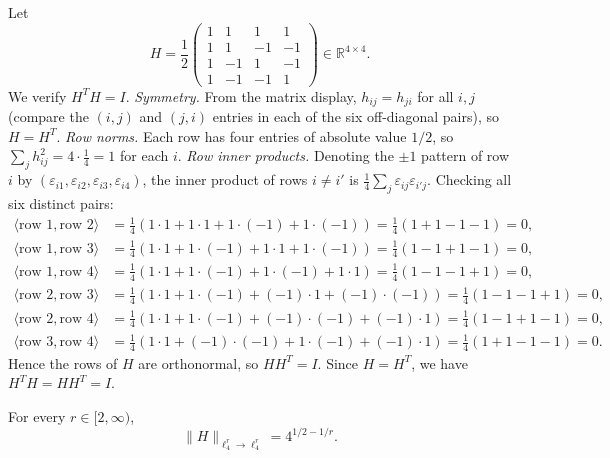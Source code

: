 Let
\[
H=\frac{1}{2}
\begin{pmatrix}
1&1&1&1\\
1&1&-1&-1\\
1&-1&1&-1\\
1&-1&-1&1
\end{pmatrix}\in\mathbb{R}^{4\times4}.
\]
We verify $H^TH=I$.
\textit{Symmetry.} From the matrix display, $h_{ij}=h_{ji}$ for all $i,j$ (compare the $(i,j)$ and $(j,i)$ entries in each of the six off-diagonal pairs), so $H=H^T$.
\textit{Row norms.} Each row has four entries of absolute value $1/2$, so $\sum_j h_{ij}^2 = 4\cdot\tfrac{1}{4}=1$ for each $i$.
\textit{Row inner products.} Denoting the $\pm1$ pattern of row $i$ by $(\varepsilon_{i1},\varepsilon_{i2},\varepsilon_{i3},\varepsilon_{i4})$, the inner product of rows $i\ne i'$ is $\frac{1}{4}\sum_j \varepsilon_{ij}\varepsilon_{i'j}$. Checking all six distinct pairs:
\begin{align*}
\langle\text{row }1,\text{row }2\rangle &= \tfrac{1}{4}(1\cdot1+1\cdot1+1\cdot(-1)+1\cdot(-1))=\tfrac{1}{4}(1+1-1-1)=0,\\
\langle\text{row }1,\text{row }3\rangle &= \tfrac{1}{4}(1\cdot1+1\cdot(-1)+1\cdot1+1\cdot(-1))=\tfrac{1}{4}(1-1+1-1)=0,\\
\langle\text{row }1,\text{row }4\rangle &= \tfrac{1}{4}(1\cdot1+1\cdot(-1)+1\cdot(-1)+1\cdot1)=\tfrac{1}{4}(1-1-1+1)=0,\\
\langle\text{row }2,\text{row }3\rangle &= \tfrac{1}{4}(1\cdot1+1\cdot(-1)+(-1)\cdot1+(-1)\cdot(-1))=\tfrac{1}{4}(1-1-1+1)=0,\\
\langle\text{row }2,\text{row }4\rangle &= \tfrac{1}{4}(1\cdot1+1\cdot(-1)+(-1)\cdot(-1)+(-1)\cdot1)=\tfrac{1}{4}(1-1+1-1)=0,\\
\langle\text{row }3,\text{row }4\rangle &= \tfrac{1}{4}(1\cdot1+(-1)\cdot(-1)+1\cdot(-1)+(-1)\cdot1)=\tfrac{1}{4}(1+1-1-1)=0.
\end{align*}
Hence the rows of $H$ are orthonormal, so $HH^T=I$. Since $H=H^T$, we have $H^TH=HH^T=I$.

\begin{theorem}\label{thm:hadamard-norm}
For every $r\in[2,\infty)$,
\[
\|H\|_{\ell^r_4\to\ell^r_4} = 4^{1/2-1/r}.
\]
\end{theorem}

